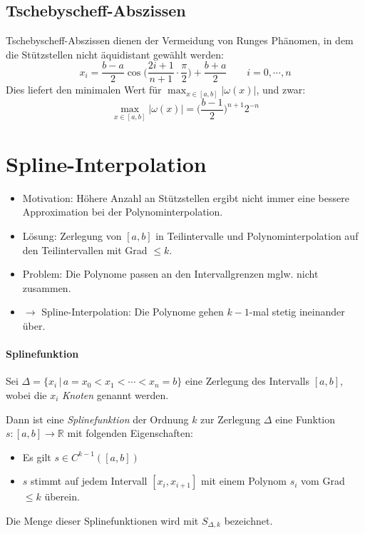 \documentclass[a4paper, 11pt, accentcolor = tud3b]{tudreport}
\newcommand{\forwhich}{\ensuremath{{\,\vert\,}}}
\newcommand{\abs}[1]{\ensuremath{{\lvert #1 \rvert}}}
\newcommand{\R}{\ensuremath{\mathbb{R}}}
\begin{document}
	        \subsection{Tschebyscheff-Abszissen}
	            Tschebyscheff-Abszissen dienen der Vermeidung von Runges Phänomen, in dem die Stützstellen nicht äquidistant gewählt werden:
	            \begin{equation*}
		            x_i = \frac{b - a}{2} \cos\Bigg(\frac{2i + 1}{n + 1} \cdot \frac{\pi}{2}\Bigg) + \frac{b + a}{2} \qquad i = 0, \cdots, n
	            \end{equation*}
	            Dies liefert den minimalen Wert für \( \max_{x \in [a, b]} \abs{\omega(x)} \), und zwar:
	            \begin{equation*}
		            \max_{x \in [a, b]} \abs{\omega(x)} = \Bigg(\frac{b - 1}{2}\Bigg)^{n + 1} 2^{-n}
	            \end{equation*}
	
	    \section{Spline-Interpolation}
	        \begin{itemize}
	        	\item Motivation: Höhere Anzahl an Stützstellen ergibt nicht immer eine bessere Approximation bei der Polynominterpolation.
	        	\item Lösung: Zerlegung von \([a,b]\) in Teilintervalle und Polynominterpolation auf den Teilintervallen mit Grad \( \leq k \).
	        	\item Problem: Die Polynome passen an den Intervallgrenzen mglw. nicht zusammen.
	        	\item[] \( \rightarrow \) Spline-Interpolation: Die Polynome gehen \( k - 1 \)-mal stetig ineinander über.
	        \end{itemize}
        
	        \paragraph{Splinefunktion}
		        Sei \( \Delta = \{ x_i \forwhich a = x_0 < x_1 < \cdots < x_n = b \} \) eine Zerlegung des Intervalls \( [a, b] \), wobei die \(x_i\) \textit{Knoten} genannt werden.
		        
		        Dann ist eine \textit{Splinefunktion} der Ordnung \(k\) zur Zerlegung \(\Delta\) eine Funktion \( s : [a, b] \rightarrow \R \) mit folgenden Eigenschaften:
		        \begin{itemize}
		        	\item Es gilt \( s \in C^{k - 1}([a, b]) \)
		        	\item \( s \) stimmt auf jedem Intervall \( [x_i, x_{i+1}] \) mit einem Polynom \(s_i\) vom Grad \( \leq k \) überein.
		        \end{itemize}
		        Die Menge dieser Splinefunktionen wird mit \( S_{\Delta, k} \) bezeichnet.
		        
\end{document}
